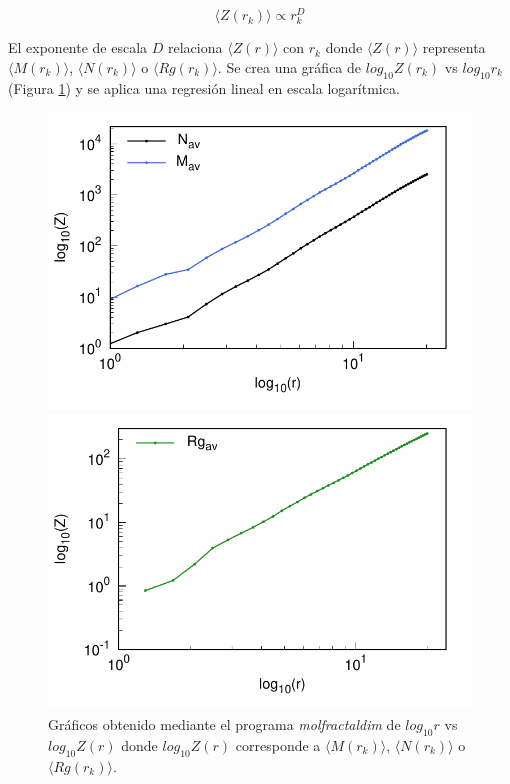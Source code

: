  	\begin{equation}
 		\langle Z(r_{k}) \rangle \propto r^{D}_{k}
 		\label{leyp2}
 	\end{equation}
 	
 	El exponente de escala $D$ relaciona $\langle Z(r) \rangle$ 
 	con $r_{k}$ donde $\langle Z(r) \rangle$ representa $\langle M(r_k) \rangle$,
 	 $\langle N(r_k) \rangle$ o $\langle Rg(r_k) \rangle$. 
 	Se crea una gráfica de $log_{10}Z(r_k)$ vs $log_{10}r_{k}$ 
 	(Figura \ref{fig:GrafD}) y se aplica una 
 	regresión lineal en escala logarítmica.
 	
	\begin{figure}[H]
		\hspace{-0.3cm} 
		\begin{minipage}{0.49\textwidth}
			\centering
			\includegraphics[width=\linewidth]{graphs/molmass/Zvsr.pdf}
		\end{minipage}
		\hspace{0.2cm}
		\begin{minipage}{0.49\textwidth}
			\centering
			\includegraphics[width=\linewidth]{graphs/molmass/Zvsr-Rg.pdf}
		\end{minipage}
		
		\caption{
			Gr\'{a}ficos obtenido mediante el programa \textit{molfractaldim} de $log_{10}r$ vs $log_{10}Z(r)$ donde $log_{10}Z(r)$ 
			corresponde a $\langle M(r_k) \rangle$, $\langle N(r_k) \rangle$ 
			o $\langle Rg(r_k) \rangle$. }
		\label{fig:GrafD}
	\end{figure}

